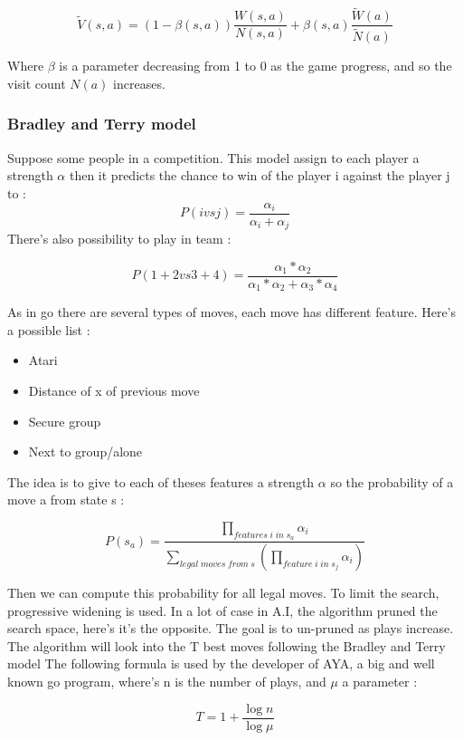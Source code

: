 $$
 \tilde{V}(s,a) = (1-\beta (s,a)) \frac{W(s,a)}{N(s,a)}+ \beta (s,a) \frac{\tilde{W}(a)}{\tilde{N}(a)}
$$

Where $\beta$ is a parameter decreasing from 1 to 0 as the game progress, and so the visit count $N(a)$ increases. 

\subsubsection{Bradley and Terry model}

Suppose some people in a competition. This model assign to each player a strength $\alpha$ then it predicts the chance to win of the player i against the player j to :
$$
P(i vs j) = \frac{\alpha_i}{\alpha_i+\alpha_j}
$$
There's also possibility to play in team : 

$$
P(1+2 vs 3+4) = \frac{\alpha_1*\alpha_2}{\alpha_1*\alpha_2+\alpha_3*\alpha_4}
$$

As in go there are several types of moves, each move has different feature. Here's a possible list :

\begin{itemize}
\item Atari
\item Distance of x of previous move
\item Secure group
\item Next to group/alone
\end{itemize}

The idea is to give to each of theses features a strength $\alpha$ so the probability of a move a from state s :

$$
P(s_a)= \frac{\prod\limits_{features\; i\; in\; s_a}\alpha_i}{\sum\limits_{legal\; moves\; from\; s}(\prod\limits_{feature\; i\; in\; s_j}\alpha_i)}
$$

Then we can compute this probability for all legal moves. To limit the search, progressive widening is used. In a lot of case in A.I, the algorithm pruned the search space, here's it's the opposite. The goal is to un-pruned as plays increase. The algorithm will look into the T best moves following the Bradley and Terry model The following formula is used by the developer of AYA, a big and well known go program, where's n is the number of plays, and $\mu$ a parameter : 

$$
T = 1+ \frac{\log n}{\log \mu}
$$